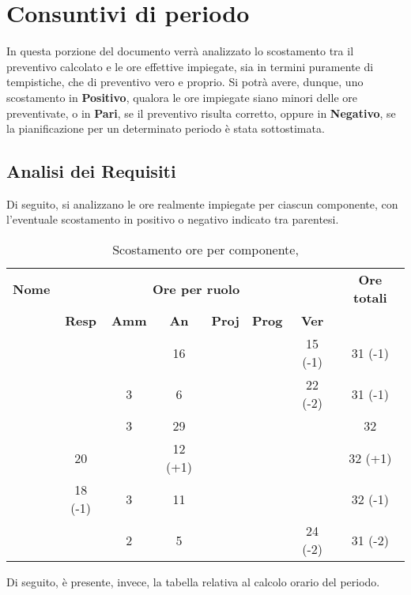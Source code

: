 \newpage

\section{Consuntivi di periodo}

In questa porzione del documento verrà analizzato lo scostamento tra il preventivo calcolato e le ore effettive impiegate, sia in termini puramente di tempistiche, che di preventivo vero e proprio. Si potrà avere, dunque, uno scostamento in \textbf{Positivo}, qualora le ore impiegate siano minori delle ore preventivate, o in \textbf{Pari}, se il preventivo risulta corretto, oppure in \textbf{Negativo}, se la pianificazione per un determinato periodo è stata sottostimata.

\subsection{Analisi dei Requisiti}

Di seguito, si analizzano le ore realmente impiegate per ciascun componente, con l'eventuale scostamento in positivo o negativo indicato tra parentesi.

\begin{table}[H]
	\begin{center}
		\begin{tabular}{|c|c|c|c|c|c|c|c|}
			\hline
			\textbf{Nome} & \multicolumn{6}{c|}{\textbf{Ore per ruolo}} & \textbf{Ore totali} \\\cline{2-7}
			& \textbf{Resp} & \textbf{Amm} & \textbf{An} & \textbf{Proj} & \textbf{Prog} & \textbf{Ver} & \\
			\hline
			\MC			&		&		&	16	&		&		&	15 (-1)	&	31 (-1)	\\
			\hline
			\AN			&		&	3	&	6	&	 	&		&	22 (-2)	& 	31 (-1)	\\
			\hline
			\DAN		&		&	3	&	29 	&		&		&		&	32	\\
			\hline
			\AS			&	20	&	 	&	12 (+1) 	&		&	 	& 		&	32 (+1)	\\
			\hline
			\NS 		&	18 (-1)	&	3	&	11	&		&		& 		&	32 (-1)	\\
			\hline
			\DS			& 		&	2	&	5	&		&		&	24 (-2)	&	31 (-2)	\\
			\hline
		\end{tabular}
	\end{center}
	\caption{Scostamento ore per componente, \AdR}
\end{table}

Di seguito, è presente, invece, la tabella relativa al calcolo orario del periodo. 

